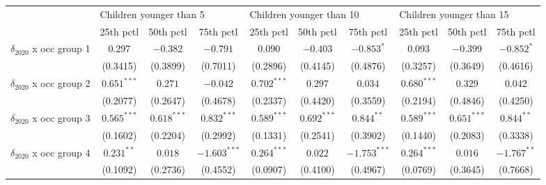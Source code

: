 \begin{tabular}{l|ccc|ccc|ccc|}
\toprule
{} & \multicolumn{3}{l}{Children younger than 5} & \multicolumn{3}{l}{Children younger than 10} & \multicolumn{3}{l}{Children younger than 15} \\
{} &               25th pctl &       50th pctl &       75th pctl &                25th pctl &       50th pctl &       75th pctl &                25th pctl &       50th pctl &       75th pctl \\
\midrule
$\delta_{2020}$ x occ group 1          &                 $0.297$ &        $-0.382$ &        $-0.791$ &                  $0.090$ &        $-0.403$ &      $-0.853^*$ &                  $0.093$ &        $-0.399$ &      $-0.852^*$ \\
                                       &                (0.3415) &        (0.3899) &        (0.7011) &                 (0.2896) &        (0.4145) &        (0.4876) &                 (0.3257) &        (0.3649) &        (0.4616) \\
$\delta_{2020}$ x occ group 2          &           $0.651^{***}$ &         $0.271$ &        $-0.042$ &            $0.702^{***}$ &         $0.297$ &         $0.034$ &            $0.680^{***}$ &         $0.329$ &         $0.042$ \\
                                       &                (0.2077) &        (0.2647) &        (0.4678) &                 (0.2337) &        (0.4420) &        (0.3559) &                 (0.2194) &        (0.4846) &        (0.4250) \\
$\delta_{2020}$ x occ group 3          &           $0.565^{***}$ &   $0.618^{***}$ &   $0.832^{***}$ &            $0.589^{***}$ &   $0.692^{***}$ &    $0.844^{**}$ &            $0.589^{***}$ &   $0.651^{***}$ &    $0.844^{**}$ \\
                                       &                (0.1602) &        (0.2204) &        (0.2992) &                 (0.1331) &        (0.2541) &        (0.3902) &                 (0.1440) &        (0.2083) &        (0.3338) \\
$\delta_{2020}$ x occ group 4          &            $0.231^{**}$ &         $0.018$ &  $-1.603^{***}$ &            $0.264^{***}$ &         $0.022$ &  $-1.753^{***}$ &            $0.264^{***}$ &         $0.016$ &   $-1.767^{**}$ \\
                                       &                (0.1092) &        (0.2736) &        (0.4552) &                 (0.0907) &        (0.4100) &        (0.4967) &                 (0.0769) &        (0.3645) &        (0.7668) \\

\end{tabular}
